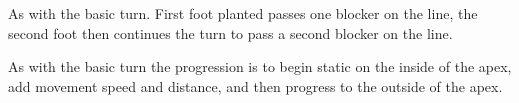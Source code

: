 As with the basic turn. First foot planted passes one blocker on the line, the second foot then continues the turn to pass a second blocker on the line.


As with the basic turn the progression is to begin static on the inside of the apex, add movement speed and distance, and then progress to the outside of the apex.  
